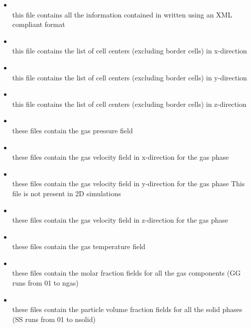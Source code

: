 \begin{itemize}

\item {}  \\
      this file contains all the information contained in 
      written using an XML compliant format

\item {} \\
      this file contains the list of cell centers (excluding border cells) 
      in x-direction

\item {} \\
      this file contains the list of cell centers (excluding border cells) 
      in y-direction

\item {} \\
      this file contains the list of cell centers (excluding border cells) 
      in z-direction

\item {} \\
      these files contain the gas pressure field 

\item {} \\
      these files contain the gas velocity field in x-direction
      for the gas phase

\item {} \\
      these files contain the gas velocity field in y-direction
      for the gas phase
      This file is not present in 2D simulations

\item {} \\
      these files contain the gas velocity field in z-direction
for the gas phase

\item {} \\
      these files contain the gas temperature field 

\item {} \\
      these files contain the molar fraction fields for all the gas 
      components (GG runs from 01 to ngas) 

\item {} \\
      these files contain the particle volume fraction fields for all the 
      solid phases (SS runs from 01 to nsolid) 


\end{itemize}
